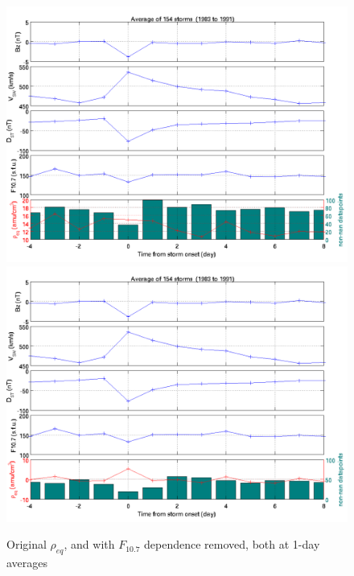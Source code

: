 \documentclass[10pt,twocolumn]{article}
\begin{document}
\begin{figure}[htp!]
\centering
\includegraphics[scale=0.7]{paperfigures/stormavs-dst-day.png}
\includegraphics[scale=0.7]{paperfigures/stormavs-dst-day-nof107.png}
\caption{Original $\rho_{eq}$, and with $F_{10.7}$ dependence removed, both at 1-day averages}
\label{nof107day}
\end{figure}
\end{document}
